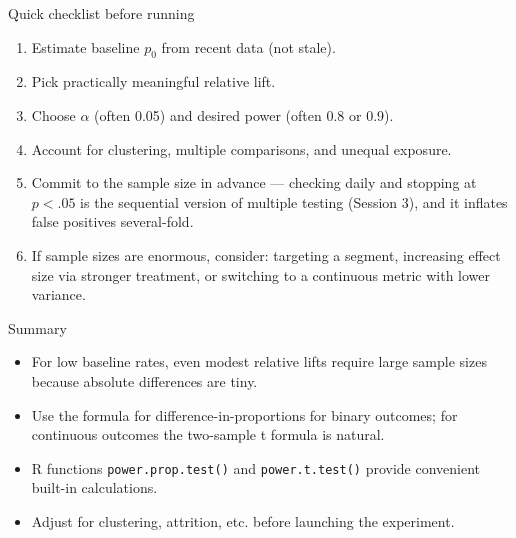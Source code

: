 \documentclass[aspectratio=169,11pt]{beamer}
\begin{document}
\begin{frame}{Quick checklist before running}
  \begin{enumerate}
    \item Estimate baseline $p_0$ from recent data (not stale).
    \item Pick practically meaningful \alert{relative} lift.
    \item Choose $\alpha$ (often 0.05) and desired power (often 0.8 or 0.9).
    \item Account for clustering, multiple comparisons, and unequal exposure.
    \item Commit to the sample size \alert{in advance} --- checking daily and stopping
    at $p<.05$ is the sequential version of multiple testing (Session 3), and it
    inflates false positives several-fold.
    \item If sample sizes are enormous, consider: targeting a segment, increasing effect size via stronger treatment, or switching to a continuous metric with lower variance.
  \end{enumerate}
\end{frame}

\begin{frame}{Summary}
  \begin{itemize}
    \item For low baseline rates, even modest relative lifts require large sample sizes because absolute differences are tiny.
    \item Use the formula for difference-in-proportions for binary outcomes; for continuous outcomes the two-sample t formula is natural.
    \item R functions \texttt{power.prop.test()} and \texttt{power.t.test()} provide convenient built-in calculations.
    \item Adjust for clustering, attrition, etc. before launching the experiment.
  \end{itemize}
\end{frame}


\end{document}
